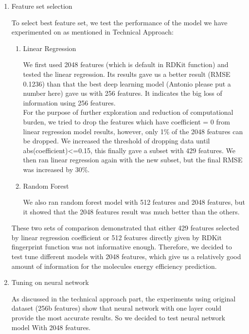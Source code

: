 \documentclass[11pt]{article}
\begin{document}
\begin{enumerate}
\item Feature set selection

To select best feature set, we test the performance of the model we have experimented on as mentioned in Technical Approach: 
\begin{enumerate}
\item Linear Regression

We first used 2048 features (which is default in RDKit function) and tested the linear regression. Its results gave us a better result (RMSE 0.1236) than that the best deep learning model (Antonio please put a number here) gave us with 256 features. It indicates the big loss of information using 256 features. \\
For the purpose of further exploration and reduction of computational burden, we tried to drop the features which have coefficient = 0 from linear regression model results, however, only 1\% of the 2048 features can be dropped. We increased the threshold of dropping data until abs(coefficient)<=0.15, this finally gave a subset with 429 features. We then ran linear regression again with the new subset, but the final RMSE was increased by 30\%. 

\item Random Forest

We also ran random forest model with 512 features and 2048 features, but it showed that the 2048 features result was much better than the others. 
\end{enumerate}

These two sets of comparison demonstrated that either 429 features selected by linear regression coefficient or 512 features directly given by RDKit fingerprint function was not informative enough. Therefore, we decided to test tune different models with 2048 features, which give us a relatively good amount of information for the molecules energy efficiency prediction. \\

\item Tuning on neural network

As discussed in the technical approach part, the experiments using original dataset (256b features) show that neural network with one layer could provide the most accurate results. So we decided to test neural network model With 2048 features. 


\end{enumerate}
\end{document}
